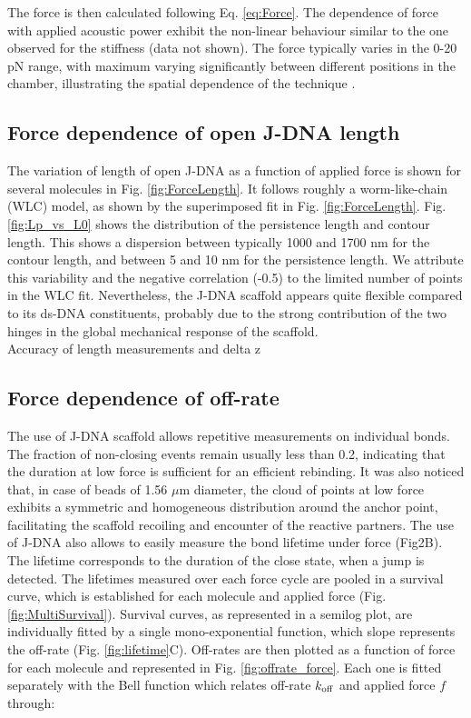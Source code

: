 \documentclass{biophys-new}
\begin{document}
The force is then calculated following Eq. \ref{eq:Force}. The dependence of force with applied acoustic power exhibit the non-linear behaviour similar to the one observed for the stiffness (data not shown). %
The force typically varies in the 0-20 pN range, with maximum varying significantly between different positions in the chamber, illustrating the spatial dependence of the technique \cite{nguyen2021}.


\subsection*{Force dependence of open J-DNA length}

The variation of length of open J-DNA as a function of applied force is shown for several molecules in Fig. \ref{fig:ForceLength}. It follows roughly a worm-like-chain (WLC) model, as shown by the superimposed fit in Fig. \ref{fig:ForceLength}. Fig. \ref{fig:Lp_vs_L0} shows the distribution of the persistence length and contour length. This shows a dispersion between typically 1000 and 1700 nm for the contour length, and between 5 and 10 nm for the persistence length. We attribute this variability and the negative correlation (-0.5) to the limited number of points in the WLC fit. Nevertheless, the J-DNA scaffold appears quite flexible compared to its ds-DNA constituents, probably due to the strong contribution of the two hinges in the global mechanical response of the scaffold.\\
{\color{red} Accuracy of length measurements and delta z}

\subsection*{Force dependence of off-rate}

The use of J-DNA scaffold allows repetitive measurements on individual bonds.
The fraction of non-closing events remain usually less than 0.2,  %
indicating that the duration at low force is sufficient for an efficient rebinding. It was also noticed that, in case of beads of 1.56 $\mu$m diameter, the cloud of points at low force exhibits a symmetric and homogeneous distribution around the anchor point, facilitating the scaffold recoiling and encounter of the reactive partners. The use of J-DNA also allows to easily measure the bond lifetime under force (Fig2B). The lifetime
corresponds to the duration of the close state, when a jump is detected. %
The lifetimes measured over each force cycle are pooled in a survival curve, which is established for each molecule and applied force (Fig. \ref{fig:MultiSurvival}). Survival curves, as represented in a semilog plot, are individually fitted by a single mono-exponential function, which slope represents the off-rate (Fig. \ref{fig:lifetime}C). Off-rates are then plotted as a function of force for each molecule and represented in Fig. \ref{fig:offrate_force}. Each one is fitted separately with the Bell function which relates off-rate $ k_{\rm off}$ and applied force $f$ through:
\end{document}
